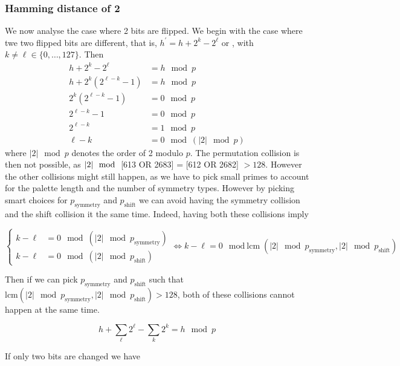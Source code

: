 \documentclass{article}
\begin{document}
\subsubsection{Hamming distance of 2}
We now analyse the case where 2 bits are flipped. We begin with the case where twe two flipped bits are different, that is, $h^\prime = h + 2^k - 2^\ell$ or , with $k \neq \ell \in \{0, \dotsc, 127\}$. Then
\begin{align*}
	h + 2^k - 2^{\ell} &= h \mod p\\
	h + 2^k(2^{\ell - k} - 1) &= h \mod p \\
	2^k (2^{\ell - k} - 1) &= 0 \mod p \\
	2^{\ell - k} - 1 &= 0 \mod p \\
	2^{\ell - k} &= 1 \mod p \\
	\ell - k &= 0 \mod (|2| \mod p)
\end{align*}
where $|2| \mod p $ denotes the order of 2 modulo $p$. The permutation collision is then not possible, as $|2| \mod $ [613 OR 2683] = [612 OR 2682] $> 128$. However the other collisions might still happen, as we have to pick small primes to account for the palette length and the number of symmetry types. However by picking smart choices for $p_\text{symmetry}$ and $p_\text{shift}$ we can avoid having the symmetry collision and the shift collision it the same time. Indeed, having both these collisions imply

$$\begin{cases}
k - \ell &= 0 \mod (|2| \mod p_\text{symmetry})\\
k - \ell &= 0 \mod (|2| \mod p_\text{shift})
\end{cases} \iff k - \ell = 0 \mod \text{lcm}(|2| \mod p_\text{symmetry}, |2| \mod p_\text{shift})$$

Then if we can pick $p_\text{symmetry}$ and $p_\text{shift}$ such that $\text{lcm}(|2| \mod p_\text{symmetry}, |2| \mod p_\text{shift}) > 128$, both of these collisions cannot happen at the same time. 

$$	h + \sum\limits_\ell 2^\ell - \sum\limits_k 2^k = h \mod p $$

If only two bits are changed we have
\end{document}
